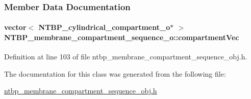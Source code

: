 \subsubsection{Member Data Documentation}
\paragraph[{compartmentVec}]{\setlength{\rightskip}{0pt plus 5cm}vector$<$ {\bf NTBP\_\-cylindrical\_\-compartment\_\-o}$\ast$ $>$ {\bf NTBP\_\-membrane\_\-compartment\_\-sequence\_\-o::compartmentVec}}\hfill\label{class_n_t_b_p__membrane__compartment__sequence__o_ac60d89cbb9bd82124ecd978fa9233f51}


Definition at line 103 of file ntbp\_\-membrane\_\-compartment\_\-sequence\_\-obj.h.



The documentation for this class was generated from the following file:\begin{DoxyCompactItemize}
\item 
\hyperlink{ntbp__membrane__compartment__sequence__obj_8h}{ntbp\_\-membrane\_\-compartment\_\-sequence\_\-obj.h}\end{DoxyCompactItemize}
